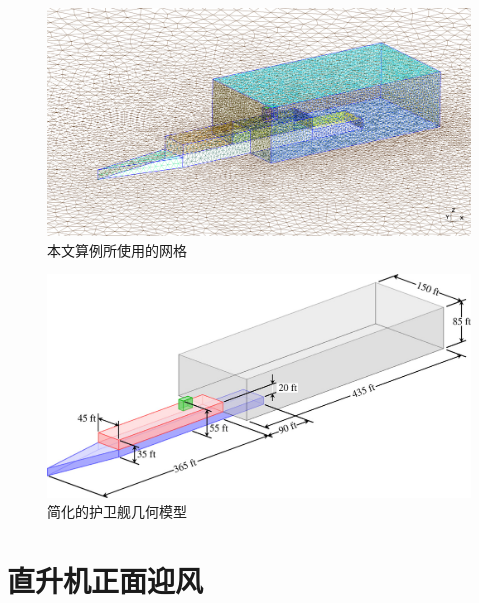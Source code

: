 \begin{figure}[h!]
\begin{centering}
\includegraphics[width=1\textwidth,height=0.4\textheight,keepaspectratio]{figures/ship/grid}
\par\end{centering}
\caption{\label{fig:ship_mesh}本文算例所使用的网格}
\end{figure}

\begin{figure}[h!]
\begin{centering}
\includegraphics[width=1\textwidth,height=0.4\textheight,keepaspectratio]{figures/ship/simple_frigate.jpeg}
\par\end{centering}
\caption{\label{fig:ship_geometry}简化的护卫舰几何模型}
\end{figure}


\section{直升机正面迎风}

